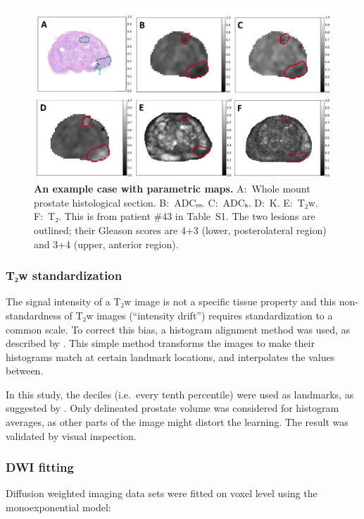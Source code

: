 \begin{figure}[!h]
    \centering \includegraphics[width=1.0\textwidth]{figures/fig2}
    \caption{{\bf An example case with parametric maps.}
    A:~Whole mount prostate histological section.
    B:~ADCₘ. C:~ADCₖ. D:~K. E:~T₂w. F:~T₂.
    This is from patient \#43 in Table~S1. The two lesions are outlined; their
    Gleason scores are 4+3 (lower, posterolateral region) and 3+4 (upper,
    anterior region).}%
    \label{fig:pmap}
\end{figure}

\subsubsection{T₂w standardization}

The signal intensity of a T₂w image is not a specific tissue property and
this non-standardness of T₂w images (``intensity drift'') requires
standardization to a common scale. To correct this bias, a histogram alignment
method was used, as described by \citet{Nyul1999,Nyul2000}. This simple method
transforms the images to make their histograms match at certain landmark
locations,  and interpolates the values between.

In this study, the deciles (i.e.\ every tenth percentile) were used as
landmarks, as suggested by \citet{Nyul1999}. Only delineated prostate volume was
considered for histogram averages, as other parts of the image might distort the
learning. The result was validated by visual inspection.

\subsubsection{DWI fitting}

Diffusion weighted imaging data sets were fitted on voxel level using the
monoexponential model:

